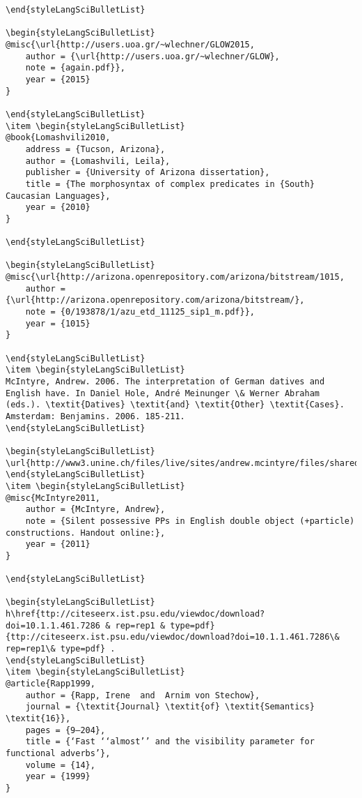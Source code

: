 \documentclass[output=paper,modfonts,nonflat,
 hidelinks
]{langsci/langscibook}
\begin{document}
\begin{verbatim}
\end{styleLangSciBulletList}

\begin{styleLangSciBulletList}
@misc{\url{http://users.uoa.gr/~wlechner/GLOW2015,
	author = {\url{http://users.uoa.gr/~wlechner/GLOW},
	note = {again.pdf}},
	year = {2015}
}

\end{styleLangSciBulletList}
\item \begin{styleLangSciBulletList}
@book{Lomashvili2010,
	address = {Tucson, Arizona},
	author = {Lomashvili, Leila},
	publisher = {University of Arizona dissertation},
	title = {The morphosyntax of complex predicates in {South} Caucasian Languages},
	year = {2010}
}

\end{styleLangSciBulletList}

\begin{styleLangSciBulletList}
@misc{\url{http://arizona.openrepository.com/arizona/bitstream/1015,
	author = {\url{http://arizona.openrepository.com/arizona/bitstream/},
	note = {0/193878/1/azu_etd_11125_sip1_m.pdf}},
	year = {1015}
}

\end{styleLangSciBulletList}
\item \begin{styleLangSciBulletList}
McIntyre, Andrew. 2006. The interpretation of German datives and English have. In Daniel Hole, André Meinunger \& Werner Abraham (eds.). \textit{Datives} \textit{and} \textit{Other} \textit{Cases}. Amsterdam: Benjamins. 2006. 185-211.
\end{styleLangSciBulletList}

\begin{styleLangSciBulletList}
\url{http://www3.unine.ch/files/live/sites/andrew.mcintyre/files/shared/mcintyre/mcintyre.dative.band.prepub.pdf}
\end{styleLangSciBulletList}
\item \begin{styleLangSciBulletList}
@misc{McIntyre2011,
	author = {McIntyre, Andrew},
	note = {Silent possessive PPs in English double object (+particle) constructions. Handout online:},
	year = {2011}
}

\end{styleLangSciBulletList}

\begin{styleLangSciBulletList}
h\href{ttp://citeseerx.ist.psu.edu/viewdoc/download?doi=10.1.1.461.7286 & rep=rep1 & type=pdf} {ttp://citeseerx.ist.psu.edu/viewdoc/download?doi=10.1.1.461.7286\& rep=rep1\& type=pdf} .
\end{styleLangSciBulletList}
\item \begin{styleLangSciBulletList}
@article{Rapp1999,
	author = {Rapp, Irene  and  Arnim von Stechow},
	journal = {\textit{Journal} \textit{of} \textit{Semantics} \textit{16}},
	pages = {9–204},
	title = {‘Fast ‘‘almost’’ and the visibility parameter for functional adverbs’},
	volume = {14},
	year = {1999}
}


\end{verbatim}
\end{document}
